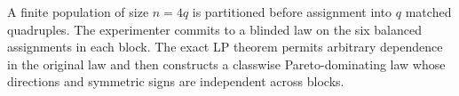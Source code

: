 A finite population of size \(n=4q\) is partitioned before assignment into \(q\) matched quadruples. The experimenter commits to a blinded law on the six balanced assignments in each block. The exact LP theorem permits arbitrary dependence in the original law and then constructs a classwise Pareto-dominating law whose directions and symmetric signs are independent across blocks.